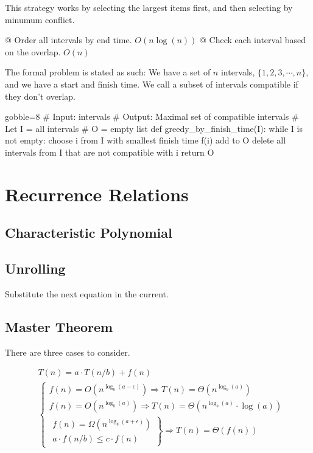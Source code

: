 \documentclass[10pt]{article}
\begin{document}
This strategy works by selecting the largest items first, and then selecting by minumum conflict.

    \NewList
    \begin{easylist}[enumerate]
        @ Order all intervals by end time. $O(n \log(n))$
        @ Check each interval based on the overlap. $O(n)$
    \end{easylist}

The formal problem is stated as such: We have a set of $n$ intervals, $\{1, 2, 3, \cdots, n\}$, and we have a start and finish time. We call a subset of intervals compatible if they don't overlap.

    \begin{pythoncode*}{gobble=8}
        # Input: intervals
        # Output: Maximal set of compatible intervals
        # Let I = all intervals
        #     O = empty list
        def greedy_by_finish_time(I):
            while I is not empty:
                choose i from I with smallest finish time f(i)
                add to O
                delete all intervals from I that are not compatible with i
            return O
    \end{pythoncode*}

\section{Recurrence Relations}
    \subsection{Characteristic Polynomial}

    \subsection{Unrolling}
    Substitute the next equation in the current.

    \subsection{Master Theorem}
    There are three cases to consider.

        \[ \begin{aligned}
                & T(n) = a \cdot T(n/b) + f(n)\\
                & \begin{cases}
                    f(n) = O \left( n^{\log_b(a-\epsilon)} \right) \Rightarrow T(n) = \Theta \left( n^{\log_b(a)} \right)\\
                    f(n) = O \left( n^{\log_b(a)} \right) \Rightarrow T(n) = \Theta \left( n^{\log_b(a)} \cdot \log(a) \right)\\
                    \left. \begin{matrix}
                        f(n) = \Omega \left( n^{\log_b(a + \epsilon)} \right)\\
                        a \cdot f(n/b) \le c \cdot f(n)
                    \end{matrix} \right\} \Rightarrow T(n) = \Theta(f(n))
                \end{cases}
            \end{aligned} \]
\end{document}
